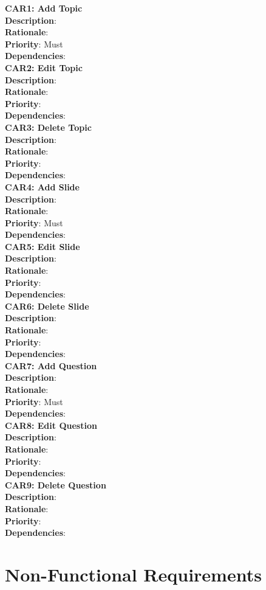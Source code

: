 \documentclass{l3proj}
\begin{document}
\textbf{CAR1: Add Topic}\\
\textbf{Description}: \\
\textbf{Rationale}: \\
\textbf{Priority}: Must\\
\textbf{Dependencies}:\\

\textbf{CAR2: Edit Topic}\\
\textbf{Description}: \\
\textbf{Rationale}: \\
\textbf{Priority}: \\
\textbf{Dependencies}:\\

\textbf{CAR3: Delete Topic}\\
\textbf{Description}: \\
\textbf{Rationale}: \\
\textbf{Priority}: \\
\textbf{Dependencies}:\\

\textbf{CAR4: Add Slide}\\
\textbf{Description}: \\
\textbf{Rationale}: \\
\textbf{Priority}: Must\\
\textbf{Dependencies}:\\

\textbf{CAR5: Edit Slide}\\
\textbf{Description}: \\
\textbf{Rationale}: \\
\textbf{Priority}: \\
\textbf{Dependencies}:\\

\textbf{CAR6: Delete Slide}\\
\textbf{Description}:\\ 
\textbf{Rationale}: \\
\textbf{Priority}: \\
\textbf{Dependencies}:\\

\textbf{CAR7: Add Question}\\
\textbf{Description}: \\
\textbf{Rationale}: \\
\textbf{Priority}: Must\\
\textbf{Dependencies}:\\

\textbf{CAR8: Edit Question}\\
\textbf{Description}: \\
\textbf{Rationale}: \\
\textbf{Priority}: \\
\textbf{Dependencies}:\\

\textbf{CAR9: Delete Question}\\
\textbf{Description}: \\
\textbf{Rationale}: \\
\textbf{Priority}: \\
\textbf{Dependencies}:\\

\section{Non-Functional Requirements}
\end{document}
